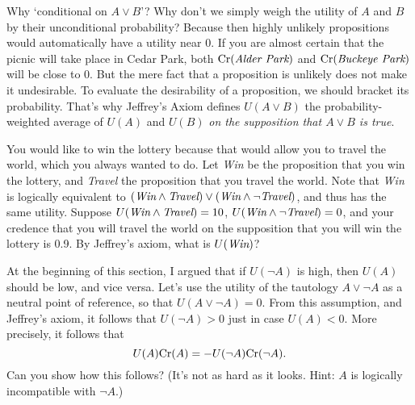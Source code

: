 Why `conditional on $A \lor B$'? Why don't we simply weigh the utility
of $A$ and $B$ by their unconditional probability? Because then highly
unlikely propositions would automatically have a utility near 0. If
you are almost certain that the picnic will take place in Cedar Park,
both $\text{Cr}(\emph{Alder Park})$ and $\text{Cr}(\emph{Buckeye Park})$ will be
close to 0. But the mere fact that a proposition is unlikely does not
make it undesirable. To evaluate the desirability of a proposition, we
should bracket its probability. That's why Jeffrey's Axiom defines
$U(A \lor B)$ the probability-weighted average of $U(A)$ and $U(B)$ \emph{on
the supposition that $A \lor B$ is true}.

\begin{exercise1}
  You would like to win the lottery because that would allow you to
  travel the world, which you always wanted to do. Let \emph{Win} be
  the proposition that you win the lottery, and \emph{Travel} the
  proposition that you travel the world. Note that \emph{Win} is
  logically equivalent to $(\emph{Win} \land \emph{Travel}) \lor
  (\emph{Win} \land \neg \emph{Travel})$, and thus has the same
  utility. Suppose $U(\emph{Win} \land \emph{Travel}) = 10$,
  $U(\emph{Win} \land \neg \emph{Travel}) = 0$, and your credence that
  you will travel the world on the supposition that you will win the
  lottery is 0.9. By Jeffrey's axiom, what is $U(\emph{Win})$?
\end{exercise1}

\begin{exercise2}
  At the beginning of this section, I argued that if $U(\neg A)$ is
  high, then $U(A)$ should be low, and vice versa. Let's use the
  utility of the tautology $A \lor \neg A$ as a neutral point of
  reference, so that $U(A \lor \neg A) = 0$. From this assumption, and
  Jeffrey's axiom, it follows that $U(\neg A) > 0$ just in case $U(A)
  < 0$. More precisely, it follows that
  \[
  U(A)\text{Cr}(A) = - U(\neg A)\text{Cr}(\neg A).
  \]
  Can you show how this follows? (It's not as hard as it looks. Hint:
  $A$ is logically incompatible with $\neg A$.)
\end{exercise2}

